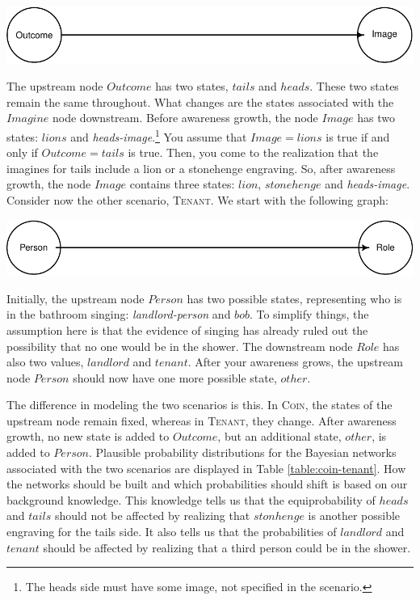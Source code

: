 \documentclass[
  11pt,
  dvipsnames,enabledeprecatedfontcommands]{scrartcl}
\begin{document}
\begin{center}\includegraphics[width=0.5\linewidth,height=0.3\textheight]{ReplyToSteeleStefansson5_files/figure-latex/tailsDAG-1} \end{center}

\noindent The upstream node \(Outcome\) has two states, \(tails\) and
\(heads\). These two states remain the same throughout. What changes are
the states associated with the \(Imagine\) node downstream. Before
awareness growth, the node \(Image\) has two states: \(lions\) and
\textit{heads-image}.\footnote{The heads side must have some image, not
  specified in the scenario.} You assume that \(Image=lions\) is true if
and only if \(Outcome=tails\) is true. Then, you come to the realization
that the imagines for tails include a lion or a stonehenge engraving.
So, after awareness growth, the node \(Image\) contains three states:
\(lion\), \(stonehenge\) and \textit{heads-image}. Consider now the
other scenario, \textsc{Tenant}. We start with the following graph:

\begin{center}\includegraphics[width=0.5\linewidth,height=0.3\textheight]{ReplyToSteeleStefansson5_files/figure-latex/tenantsDAG-1} \end{center}

\noindent Initially, the upstream node \(Person\) has two possible
states, representing who is in the bathroom singing:
\textit{landlord-person} and \(bob\). To simplify things, the assumption
here is that the evidence of singing has already ruled out the
possibility that no one would be in the shower. The downstream node
\(Role\) has also two values, \(landlord\) and \(tenant\). After your
awareness grows, the upstream node \(Person\) should now have one more
possible state, \(other\).

The difference in modeling the two scenarios is this. In \textsc{Coin},
the states of the upstream node remain fixed, whereas in
\textsc{Tenant}, they change. After awareness growth, no new state is
added to \(Outcome\), but an additional state, \(other\), is added to
\(Person\). Plausible probability distributions for the Bayesian
networks associated with the two scenarios are displayed in Table
\ref{table:coin-tenant}. How the networks should be built and which
probabilities should shift is based on our background knowledge. This
knowledge tells us that the equiprobability of \(heads\) and \(tails\)
should not be affected by realizing that \(stonhenge\) is another
possible engraving for the tails side. It also tells us that the
probabilities of \(landlord\) and \(tenant\) should be affected by
realizing that a third person could be in the shower.
\end{document}
